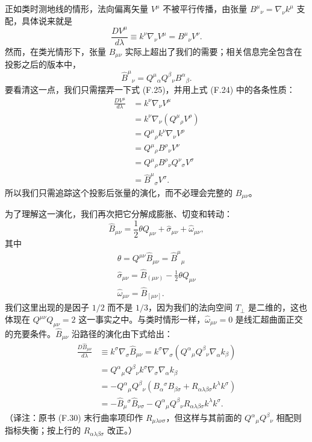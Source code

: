 正如类时测地线的情形，法向偏离矢量 $V^\mu$ 不被平行传播，由张量 $B^\mu{}_\nu = \nabla_\nu k^\mu$ 支配，具体说来就是
\begin{equation*}
\frac{DV^\mu}{d\lambda} \equiv k^\nu\nabla_\nu V^\mu = B^\mu{}_\nu V^\nu.
\tag{F.25}
\end{equation*}
然而，在类光情形下，张量 $B_{\mu\nu}$ 实际上超出了我们的需要；相关信息完全包含在投影之后的版本中，
\begin{equation*}
\widehat{B}^\mu{}_\nu = Q^\mu{}_\alpha Q^\beta{}_\nu B^\alpha{}_\beta.
\tag{F.26}
\end{equation*}
要看清这一点，我们只需摆弄一下式 (F.25)，并用上式 (F.24) 中的各条性质：
\begin{align*}
\frac{DV^\mu}{d\lambda} &= k^\nu\nabla_\nu V^\mu \\
&= k^\nu\nabla_\nu(Q^\mu{}_\rho V^\rho) \\
&= Q^\mu{}_\rho k^\nu\nabla_\nu V^\rho \\
&= Q^\mu{}_\rho B^\rho{}_\nu V^\nu \\
&= Q^\mu{}_\rho B^\rho{}_\nu Q^\nu{}_\sigma V^\sigma \\
&= \widehat{B}^\mu{}_\sigma V^\sigma.
\tag{F.27}
\end{align*}
所以我们只需追踪这个投影后张量的演化，而不必理会完整的 $B_{\mu\nu}$。

为了理解这一演化，我们再次把它分解成膨胀、切变和转动：
\begin{equation*}
\widehat{B}_{\mu\nu} = \frac{1}{2}\theta Q_{\mu\nu} + \widehat{\sigma}_{\mu\nu} + \widehat{\omega}_{\mu\nu},
\tag{F.28}
\end{equation*}
其中
\begin{gather*}
\theta = Q^{\mu\nu}\widehat{B}_{\mu\nu} = \widehat{B}^\mu{}_\mu \\
\widehat{\sigma}_{\mu\nu} = \widehat{B}_{(\mu\nu)} - \frac{1}{2}\theta Q_{\mu\nu} \\
\widehat{\omega}_{\mu\nu} = \widehat{B}_{[\mu\nu]}.
\tag{F.29}
\end{gather*}
我们这里出现的是因子 $1/2$ 而不是 $1/3$，因为我们的法向空间 $T_\perp$ 是二维的，这也体现在 $Q^{\mu\nu}Q_{\mu\nu} = 2$ 这一事实之中。与类时情形一样，$\widehat{\omega}_{\mu\nu} = 0$ 是线汇超曲面正交的充要条件。$\widehat{B}_{\mu\nu}$ 沿路径的演化由下式给出：
\begin{align*}
\frac{D\widehat{B}_{\mu\nu}}{d\lambda} &\equiv k^\sigma\nabla_\sigma\widehat{B}_{\mu\nu} = k^\sigma\nabla_\sigma(Q^\alpha{}_\mu Q^\beta{}_\nu\nabla_\alpha k_\beta) \\
&= Q^\alpha{}_\mu Q^\beta{}_\nu k^\sigma\nabla_\sigma\nabla_\alpha k_\beta \\
&= -Q^\alpha{}_\mu Q^\beta{}_\nu\left(B_\alpha{}^\sigma B_{\beta\sigma} + R_{\alpha\lambda\beta\sigma}k^\lambda k^\sigma\right) \\
&= -\widehat{B}_\mu{}^\sigma\widehat{B}_{\nu\sigma} - Q^\alpha{}_\mu Q^\beta{}_\nu R_{\alpha\lambda\beta\sigma}k^\lambda k^\sigma.
\tag{F.30}
\end{align*}
（译注：原书 (F.30) 末行曲率项印作 $R_{\mu\lambda\nu\sigma}$，但这样与其前面的 $Q^\alpha{}_\mu Q^\beta{}_\nu$ 相配则指标失衡；按上行的 $R_{\alpha\lambda\beta\sigma}$ 改正。）

